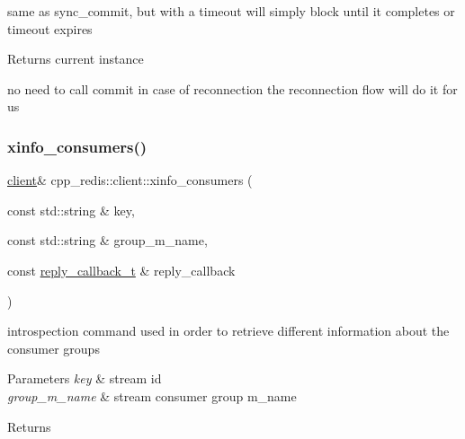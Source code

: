 same as sync\+\_\+commit, but with a timeout will simply block until it completes or timeout expires

\begin{DoxyReturn}{Returns}
current instance 
\end{DoxyReturn}
no need to call commit in case of reconnection the reconnection flow will do it for us \mbox{\label{classcpp__redis_1_1client_a972e59c216b86e38a1b77a4ca0bc6785}} 
\subsubsection{\texorpdfstring{xinfo\+\_\+consumers()}{xinfo\_consumers()}\hspace{0.1cm}{\footnotesize\ttfamily [1/2]}}
{\footnotesize\ttfamily \mbox{\hyperlink{classcpp__redis_1_1client}{client}}\& cpp\+\_\+redis\+::client\+::xinfo\+\_\+consumers (\begin{DoxyParamCaption}\item[{const std\+::string \&}]{key,  }\item[{const std\+::string \&}]{group\+\_\+m_name,  }\item[{const \mbox{\hyperlink{classcpp__redis_1_1client_af7a65eb21aa25230bfbb0b0203c4fc04}{reply\+\_\+callback\+\_\+t}} \&}]{reply\+\_\+callback }\end{DoxyParamCaption})}



introspection command used in order to retrieve different information about the consumer groups 


\begin{DoxyParams}{Parameters}
{\em key} & stream id \\
\hline
{\em group\+\_\+m_name} & stream consumer group m_name \\
\hline
\end{DoxyParams}
\begin{DoxyReturn}{Returns}

\end{DoxyReturn}
\mbox{\label{classcpp__redis_1_1client_a6497165de42557c953189305a0f22542}} 
